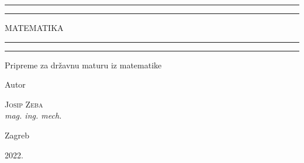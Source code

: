 \documentclass[a4paper,12pt,oneside,draft]{book}
\begin{document}
\begin{titlepage}

	\centering
	\scshape
	\vspace*{\baselineskip}


	\rule{\textwidth}{1.6pt}\vspace*{-\baselineskip}\vspace*{2pt}
	\rule{\textwidth}{0.4pt}

	\vspace{0.75\baselineskip}

	{\LARGE MATEMATIKA\\}

	\vspace{0.75\baselineskip}

	\rule{\textwidth}{0.4pt}\vspace*{-\baselineskip}\vspace{3.2pt}
	\rule{\textwidth}{1.6pt}

	\vspace{2\baselineskip}


	Pripreme za državnu maturu iz matematike

	\vspace*{3\baselineskip}


	Autor

	\vspace{0.5\baselineskip}
	{\scshape\Large Josip Zeba\\}
	\vspace{0.5\baselineskip}
	\textit{mag. ing. mech.}

	\vfill


	\vspace{0.3\baselineskip}
	Zagreb

	2022.

\end{titlepage}

\clearpage
\ifpdf
\fi
{}
\tableofcontents

\clearpage




\end{document}
